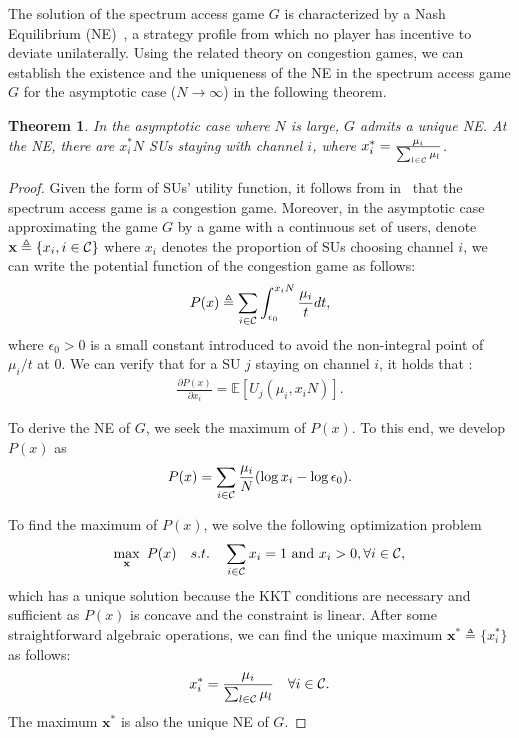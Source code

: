\documentclass[12pt, onecolumn]{IEEEtran}
\theoremstyle{plain}
\newtheorem{theorem}{Theorem}
\theoremstyle{definition}
\begin{document}
The solution of the spectrum access game $G$ is characterized by a
Nash Equilibrium (NE)~\cite{Myerson91}, a strategy profile from which no player has incentive to deviate unilaterally. Using the related theory on congestion games, we can establish the existence and the uniqueness of the NE in the spectrum access game $G$ for the asymptotic case ($N\rightarrow\infty$) in the following theorem.

\begin{theorem}
In the asymptotic case where $N$ is large, $G$ admits a unique NE. At the NE, there are $x_i^*N$ SUs staying with channel $i$, where $x_i^*=\frac{\mu_i}{\sum_{l\in {\cal C}} \mu_l}$.
\label{th:ne_congestion_game}
\end{theorem}

\begin{proof}
Given the form of SUs' utility function, it follows from in~\cite{Milchtaich96} that the spectrum access game is a congestion game. Moreover, in the asymptotic case approximating the game $G$ by a game with a continuous set of users, denote $\mathbf{x}\triangleq\{x_i, i\in{\cal C}\}$ where $x_i$ denotes the proportion of SUs choosing channel $i$, we can write the potential function of the congestion game as follows:
\begin{equation*}
P(x)\triangleq \sum_{i\in {\cal C}}\int_{\epsilon_0}^{x_iN} \frac{\mu_i}{t}dt,
\end{equation*}
where $\epsilon_0>0$ is a small constant introduced to avoid the non-integral point of $\mu_i/t$ at $0$. We can verify that for a SU $j$ staying on channel $i$, it holds that :
\begin{eqnarray*}
\frac{\partial P(x)}{\partial x_i} = \mathbb{E}[U_j(\mu_i, x_iN)].
\end{eqnarray*}

To derive the NE of $G$, we seek the maximum of $P(x)$. To this end, we develop $P(x)$ as
\begin{equation*}
P(x) = \sum_{i\in {\cal C}} \frac{\mu_i}{N} (\log x_i - \log \epsilon_0).
\end{equation*}

To find the maximum of $P(x)$, we solve the following optimization problem
\begin{eqnarray*}
\max_{\mathbf{x}} \ P(x) \quad s.t. \quad \sum_{i\in {\cal C}} x_i =1 \ \mbox{and} \ x_i>0, \forall i\in{\cal C},
\end{eqnarray*}
which has a unique solution because the KKT conditions are necessary and sufficient as $P(x)$ is concave and the constraint is linear. After some straightforward algebraic operations, we can find the unique maximum $\mathbf{x^*}\triangleq \{x_i^*\}$ as follows:
\begin{equation*}
x_i^*=\frac{\mu_i}{\sum_{l\in {\cal C}} \mu_l} \quad \forall i\in{\cal C}.
\end{equation*}
The maximum $\mathbf{x^*}$ is also the unique NE of $G$.
\end{proof}
\end{document}
